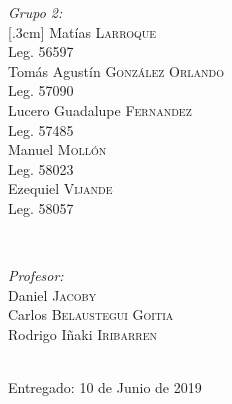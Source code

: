 \begin{titlepage}
\begin{minipage}{0.4\textwidth}
\begin{flushleft} \large
\emph{Grupo 2:}\\
[.3cm]     Matías \textsc{Larroque}\\     Leg. 56597\\      [.3cm]
Tomás Agustín \textsc{González Orlando}\\     Leg. 57090\\      [.3cm]
Lucero Guadalupe \textsc{Fernandez}\\     Leg. 57485\\      [.3cm]
Manuel \textsc{Mollón}\\     Leg. 58023\\      [.3cm]
Ezequiel \textsc{Vijande}\\     Leg. 58057\\      [.3cm]
\end{flushleft}
\end{minipage}     ~
\begin{minipage}{0.4\textwidth}
\begin{flushright} \large     \emph{Profesor:} \\     [.3cm]
Daniel \textsc{Jacoby}\\ %
Carlos \textsc{Belaustegui Goitia}\\
Rodrigo Iñaki \textsc{Iribarren}\\     \end{flushright}     \end{minipage}\\[2cm]
\vfill
{\large Entregado: 10 de Junio de 2019}\\[2cm]
\end{titlepage}
